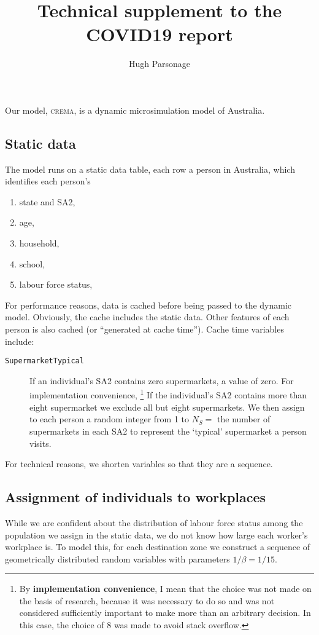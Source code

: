 \documentclass{grattan}
\title{Technical supplement to the COVID19 report}
\author{Hugh Parsonage}
\newcommand*{\code}[1]{\texttt{#1}}
\newcommand*{\defi}[1]{\textbf{#1}}
\providecommand{\crema}{\textsc{crema}}
\begin{document}
\contentspage

\label{chap:tech-supp-overview}
Our model, \crema, is a dynamic microsimulation model of Australia.

\subsection{Static data}
The model runs on a static data table, each row a person in Australia,
which identifies each person's

\begin{enumerate}
	\item state and SA2,
	\item age,
	\item household,
	\item school,
	\item labour force status,
\end{enumerate}

For performance reasons, data is cached before being passed to the dynamic model.
Obviously, the cache includes the static data. Other features of each person is
also cached (or ``generated at cache time''). Cache time variables include:

\begin{description}
\item[\code{SupermarketTypical}] If an individual's SA2 contains zero supermarkets,
a value of zero.
For implementation convenience,%
	\footnote{By \defi{implementation convenience}, I mean that the choice was not made
	on the basis of research, because it was necessary to do so and was not considered
	sufficiently important to make more than an arbitrary decision. In this case,
	the choice of 8 was made to avoid stack overflow.}
If the individual's SA2 contains more than eight supermarket we
exclude all but eight supermarkets. We then assign to each person a random integer
from 1 to \(N_S = {}\) the number of supermarkets in each SA2 to represent the
`typical' supermarket a person visits.
\end{description}

For technical reasons, we shorten variables so that they are a sequence.

\subsection{Assignment of individuals to workplaces}
While we are confident about the distribution of labour force status among
the population we assign in the static data, we do not know how large each
worker's workplace is. To model this, for each destination zone we construct
a sequence of geometrically distributed random variables with parameters
\(1/\beta = 1/15\).
\end{document}
